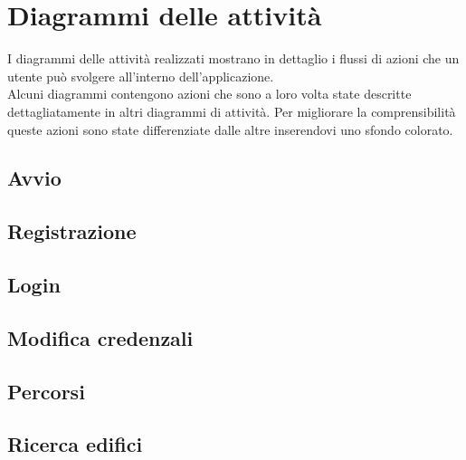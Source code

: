 \section{Diagrammi delle attività} 
I diagrammi delle attività realizzati mostrano in dettaglio i flussi di azioni che un utente può svolgere all'interno dell'applicazione. \\
Alcuni diagrammi contengono azioni che sono a loro volta state descritte dettagliatamente in altri diagrammi di attività. Per migliorare la comprensibilità queste azioni sono state differenziate dalle altre inserendovi uno sfondo colorato.
\subsection{Avvio}
\subsection{Registrazione}
\subsection{Login}
\subsection{Modifica credenzali}
\subsection{Percorsi}
\subsection{Ricerca edifici}